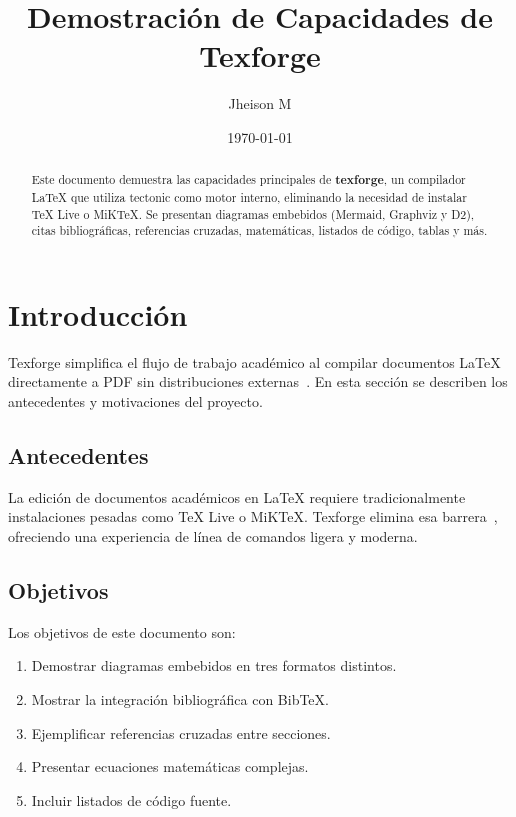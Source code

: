 \documentclass[a4paper,12pt]{article}
\title{Demostración de Capacidades de Texforge}
\author{Jheison M}
\date{\today}
\begin{document}
  \maketitle

  \begin{abstract}
    Este documento demuestra las capacidades principales de \textbf{texforge},
    un compilador LaTeX que utiliza tectonic como motor interno, eliminando la
    necesidad de instalar TeX Live o MiKTeX. Se presentan diagramas embebidos
    (Mermaid, Graphviz y D2), citas bibliográficas, referencias cruzadas,
    matemáticas, listados de código, tablas y más.
  \end{abstract}

  \tableofcontents
  \newpage

  \section{Introducción}\label{sec:intro}

  Texforge simplifica el flujo de trabajo académico al compilar documentos
  LaTeX directamente a PDF sin distribuciones externas~\cite{example}. En
  esta sección se describen los antecedentes y motivaciones del proyecto.

  \subsection{Antecedentes}

  La edición de documentos académicos en \LaTeX{} requiere tradicionalmente
  instalaciones pesadas como TeX Live o MiKTeX. Texforge elimina esa
  barrera~\cite{example2}, ofreciendo una experiencia de línea de comandos
  ligera y moderna.

  \subsection{Objetivos}

  Los objetivos de este documento son:

  \begin{enumerate}[label=(\roman*)]
    \item Demostrar diagramas embebidos en tres formatos distintos.
    \item Mostrar la integración bibliográfica con BibTeX.
    \item Ejemplificar referencias cruzadas entre secciones.
    \item Presentar ecuaciones matemáticas complejas.
    \item Incluir listados de código fuente.
  \end{enumerate}
\end{document}

